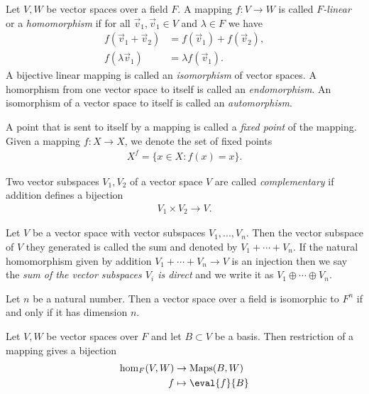 \documentclass{article}
\begin{document}
\begin{definition}
    Let $V,W$ be vector spaces over a field $F$. A mapping $f:V\to W$ is called
    \emph{$F$-linear} or a \emph{homomorphism} if for all $\vec v_1,\vec v_1\in V$ and $\lambda \in F$ we
    have
    \begin{align*}
        f(\vec v_1+\vec v_2) & = f(\vec v_1) + f(\vec v_2), \\
        f(\lambda \vec v_1)  & = \lambda f(\vec v_1).
    \end{align*}
    A bijective linear mapping is called an \emph{isomorphism} of vector spaces.
    A homorphism from one vector space to itself is called an \emph{endomorphism}.
    An isomorphism of a vector space to itself is called an \emph{automorphism}.
\end{definition}

\begin{definition}
    A point that is sent to itself by a mapping is called a \emph{fixed point} of
    the mapping. Given a mapping $f:X\to X$, we denote the set of fixed points
    \begin{align*}
        X^f = \{x\in X : f(x)=x\}.
    \end{align*}
\end{definition}

\begin{definition}
    Two vector subspaces $V_1,V_2$ of a vector space $V$ are called \emph{complementary}
    if addition defines a bijection
    \begin{align*}
        V_1\times V_2 \to V.
    \end{align*}
\end{definition}

\begin{definition}
    Let $V$ be a vector space with vector subspaces $V_1,...,V_n$. Then the vector
    subspace of $V$ they generated is called the sum and denoted by $V_1+\cdots+V_n$.
    If the natural homomorphism given by addition $V_1+\cdots +V_n\to V$ is an
    injection then we say the \emph{sum of the vector subspaces $V_i$ is direct} and
    we write it as $V_1\oplus\cdots\oplus V_n$.
\end{definition}

\begin{theorem}[Notes 1.7.7]
    Let $n$ be a natural number. Then a vector space over a field is isomorphic
    to $F^n$ if and only if it has dimension $n$.
\end{theorem}

\begin{lemma}[Notes 1.7.8]
    Let $V,W$ be vector spaces over $F$ and let $B\subset V$ be a basis. Then
    restriction of a mapping gives a bijection
    \begin{align*}
        \hom_F(V,W) & \to \text{Maps}(B,W) \\
        f           & \mapsto \eval{f}{B}
    \end{align*}
\end{lemma}
\end{document}
